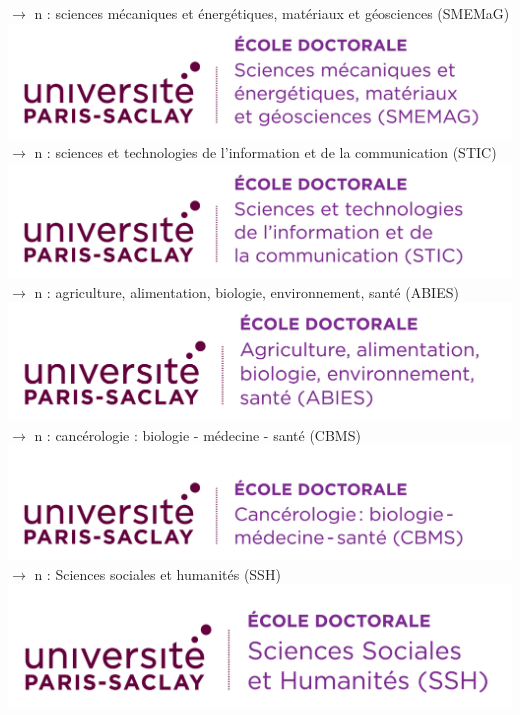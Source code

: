 \documentclass[french,12pt,a4paper]{book}
\begin{document}
\noindent \textbf{\color{Prune}$\rightarrow$} n : sciences mécaniques et énergétiques, matériaux et géosciences  (SMEMaG)\\
\includegraphics[scale=.7]{logo_usp_SMEMAG.png}\\
\newpage
\noindent \textbf{\color{Prune}$\rightarrow$} n : sciences et technologies de l'information et de la communication (STIC)\\
\includegraphics[scale=.7]{logo_usp_STIC.png}\\

\noindent \textbf{\color{Prune}$\rightarrow$} n : agriculture, alimentation, biologie, environnement, santé (ABIES)\\
\includegraphics[scale=.7]{logo_usp_ABIES.png}\\

\noindent \textbf{\color{Prune}$\rightarrow$} n : cancérologie : biologie - médecine - santé (CBMS)\\
\includegraphics[scale=.7]{logo_usp_CBMS.png}\\

\noindent \textbf{\color{Prune}$\rightarrow$} n : Sciences sociales et humanités (SSH)\\
\includegraphics[scale=.7]{logo_usp_SSH.png}\\
\end{document}
